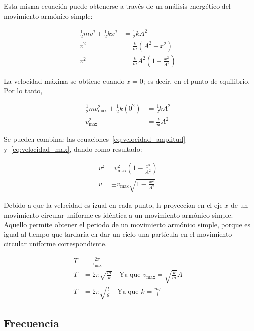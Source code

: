 \documentclass[letterpaper]{report}
\numberwithin{table}{section}
\begin{document}
Esta misma ecuación puede obtenerse a través de un análisis
energético del movimiento armónico simple:

\begin{align}
  \frac{1}{2}mv^{2} + \frac{1}{2}kx^{2} &= \frac{1}{2}kA^{2} \nonumber \\
  v^{2} &= \frac{k}{m}(A^{2} - x^{2}) \nonumber \\
  v^{2} &= \frac{k}{m}A^{2}\left(1 - \frac{x^{2}}{A^{2}}\right)
  \label{eq:velocidad_amplitud}
\end{align}

La velocidad máxima se obtiene cuando $x = 0$; es decir, en el punto de
equilibrio. Por lo tanto,

\begin{align}
  \frac{1}{2}mv_{\max}^{2} + \frac{1}{2}k(0^{2}) &= \frac{1}{2}kA^{2}
  \nonumber \\
  v_{\max}^{2} &= \frac{k}{m}A^{2} \label{eq:velocidad_max}
\end{align}

Se pueden combinar las ecuaciones~\eqref{eq:velocidad_amplitud}
y~\eqref{eq:velocidad_max}, dando como resultado:

\begin{align}
  v^{2} = v^{2}_{\max}\left(1 - \frac{x^{2}}{A^{2}}\right) \nonumber \\
  v = \pm v_{\max}\sqrt{1 - \frac{x^{2}}{A^{2}}}
\end{align}

Debido a que la velocidad es igual en cada punto, la proyección en el
eje $x$ de un movimiento circular uniforme es idéntica a un movimiento armónico
simple. Aquello permite obtener el periodo de un movimiento armónico
simple, porque es igual al tiempo que tardaría en dar un ciclo una
partícula en el movimiento circular uniforme correspondiente.

\begin{align}
  T &= \frac{2\pi}{v_{\max}} \nonumber \\
  T &= 2\pi\sqrt{\frac{m}{k}} \quad \text{Ya que $v_{\max} =
  \sqrt{\frac{k}{m}}A$} \nonumber \\
  T &= 2\pi\sqrt{\frac{l}{g}} \quad \text{Ya que $k =
  \frac{mg}{l}$}\label{eq:mas_periodo}
\end{align}

\subsection{Frecuencia}
\end{document}
